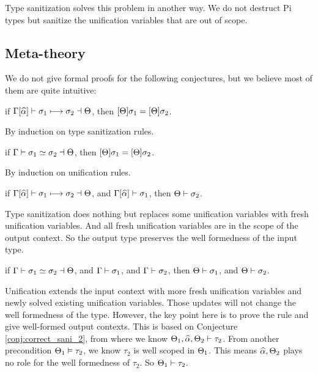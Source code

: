 Type sanitization solves this problem in another way. We do not destruct Pi
types but sanitize the unification variables that are out of scope.

\subsection{Meta-theory}

We do not give formal proofs for the following conjectures, but we believe most of
them are quite intuitive:

\begin{conjecture}
  if $\Gamma[\widehat{\alpha}] \vdash \sigma_1 \longmapsto \sigma_2 \dashv \Theta$,
  then $[\Theta] \sigma_1 = [\Theta] \sigma_2$.
\end{conjecture}
\begin{hproof}
  By induction on type sanitization rules.
\end{hproof}

\begin{conjecture}
  if $\Gamma \vdash \sigma_1 \simeq \sigma_2 \dashv \Theta$,
  then $[\Theta] \sigma_1 = [\Theta] \sigma_2$.
\end{conjecture}
\begin{hproof}
  By induction on unification rules.
\end{hproof}

\begin{conjecture}
  \label{conj:correct_sani_2}
  if $\Gamma[\widehat{\alpha}] \vdash \sigma_1 \longmapsto \sigma_2 \dashv \Theta$,
  and $\Gamma[\widehat{\alpha}] \vdash \sigma_1$,
  then $\Theta \vdash \sigma_2$.
\end{conjecture}
\begin{hproof}
  Type sanitization does nothing but replaces some unification variables with
  fresh unification variables. And all fresh unification variables are in the
  scope of the output context. So the output type preserves the well formedness
  of the input type.
\end{hproof}

\begin{conjecture}
  if $\Gamma \vdash \sigma_1 \simeq \sigma_2 \dashv \Theta$,
  and $\Gamma \vdash \sigma_1$,
  and $\Gamma \vdash \sigma_2$,
  then $\Theta \vdash \sigma_1$,
  and $\Theta \vdash \sigma_2$.
\end{conjecture}
\begin{hproof}
  Unification extends the input context with more fresh unification variables
  and newly solved existing unification variables. Those updates will not change
  the well formedness of the type. However, the key point here is to prove the rule
   and  give well-formed output contexts. This is
  based on Conjecture \ref{conj:correct_sani_2}, from where we know $\Theta_1,
  \widehat{\alpha}, \Theta_2 \vdash \tau_2$. From another precondition $\Theta_1 \vDash
  \tau_2$, we know $\tau_2$ is well scoped in $\Theta_1$. This means $\widehat{\alpha}, \Theta_2$
  plays no role for the well formedness of $\tau_2$. So $\Theta_1 \vdash \tau_2$.
\end{hproof}